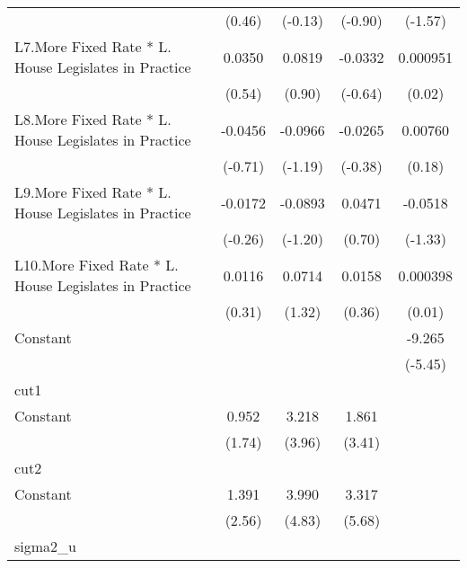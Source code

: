 {\begin{longtable}{l*{4}{c}}
                &   (0.46)         &  (-0.13)         &  (-0.90)         &  (-1.57)         \\
[1em]
L7.More Fixed Rate * L. House Legislates in Practice&   0.0350         &   0.0819         &  -0.0332         & 0.000951         \\
                &   (0.54)         &   (0.90)         &  (-0.64)         &   (0.02)         \\
[1em]
L8.More Fixed Rate * L. House Legislates in Practice&  -0.0456         &  -0.0966         &  -0.0265         &  0.00760         \\
                &  (-0.71)         &  (-1.19)         &  (-0.38)         &   (0.18)         \\
[1em]
L9.More Fixed Rate * L. House Legislates in Practice&  -0.0172         &  -0.0893         &   0.0471         &  -0.0518         \\
                &  (-0.26)         &  (-1.20)         &   (0.70)         &  (-1.33)         \\
[1em]
L10.More Fixed Rate * L. House Legislates in Practice&   0.0116         &   0.0714         &   0.0158         & 0.000398         \\
                &   (0.31)         &   (1.32)         &   (0.36)         &   (0.01)         \\
[1em]
Constant        &                  &                  &                  &   -9.265\sym{***}\\
                &                  &                  &                  &  (-5.45)         \\
\hline
cut1            &                  &                  &                  &                  \\
Constant        &    0.952         &    3.218\sym{***}&    1.861\sym{***}&                  \\
                &   (1.74)         &   (3.96)         &   (3.41)         &                  \\
\hline
cut2            &                  &                  &                  &                  \\
Constant        &    1.391\sym{*}  &    3.990\sym{***}&    3.317\sym{***}&                  \\
                &   (2.56)         &   (4.83)         &   (5.68)         &                  \\
\hline
sigma2\_u        &                  &                  &                  &                  \\

\end{longtable}}
